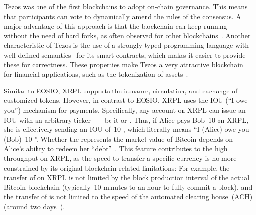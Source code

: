 Tezos was one of the first blockchains to adopt on-chain governance. 
This means that participants can vote to dynamically amend the rules of the consensus. 
A major advantage of this approach is that the blockchain can keep running without the need of hard forks, as often observed for other blockchains~\cite{byzantium-fork, dao-fork}. 
Another characteristic of Tezos is the use of a strongly typed programming language with well-defined semantics~\cite{NomadicLabs2018} for its smart contracts, which makes it easier to provide these for correctness. 
These properties make Tezos a very attractive blockchain for financial applications, such as the tokenization of assets~\cite{BTGPactual2019}.

Similar to EOSIO, XRPL supports the issuance, circulation, and exchange of customized tokens. 
However, in contrast to EOSIO, XRPL uses the IOU (``I owe you'') mechanism for payments. 
Specifically, any account on XRPL can issue an IOU with an arbitrary ticker~---~be it  or .
Thus, if Alice pays Bob~10  on XRPL, she is effectively sending an IOU of~10 , which literally means ``I (Alice) owe you (Bob)~10 ''. 
Whether the  represents the market value of Bitcoin depends on Alice's ability to redeem her ``debt''~\cite{XRPLedger2020}. 
This feature contributes to the high throughput on XRPL, as the speed to transfer a specific currency is no more constrained by its original blockchain-related limitations: For example, the transfer of  on XRPL is not limited by the block production interval of the actual Bitcoin blockchain (typically~10 minutes to an hour to fully commit a block), and the transfer of  is not limited to the speed of the automated clearing house~(ACH) (around two days~\cite{Love2013}).



